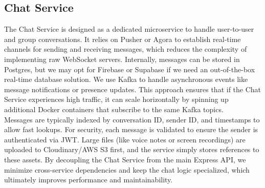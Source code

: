 \documentclass{FastFyp}
\begin{document}
\subsection{Chat Service}
The Chat Service is designed as a dedicated microservice to handle user-to-user and group conversations. It relies on Pusher or Agora to establish real-time channels for sending and receiving messages, which reduces the complexity of implementing raw WebSocket servers. Internally, messages can be stored in Postgres, but we may opt for Firebase or Supabase if we need an out-of-the-box real-time database solution. We use Kafka to handle asynchronous events like message notifications or presence updates. This approach ensures that if the Chat Service experiences high traffic, it can scale horizontally by spinning up additional Docker containers that subscribe to the same Kafka topics. \\
Messages are typically indexed by conversation ID, sender ID, and timestamps to allow fast lookups. For security, each message is validated to ensure the sender is authenticated via JWT. Large files (like voice notes or screen recordings) are uploaded to Cloudinary/AWS S3 first, and the service simply stores references to these assets. By decoupling the Chat Service from the main Express API, we minimize cross-service dependencies and keep the chat logic specialized, which ultimately improves performance and maintainability.
\end{document}
